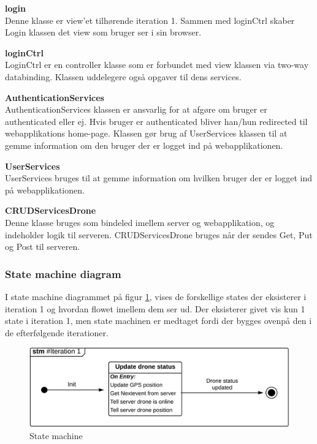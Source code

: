 \vspace{-0.2cm}

\textbf{login} \\
Denne klasse er view'et tilhørende iteration 1. Sammen med loginCtrl skaber Login klassen det view som bruger ser i sin browser.

\textbf{loginCtrl} \\
LoginCtrl er en controller klasse som er forbundet med view klassen via two-way databinding. Klassen uddelegere også opgaver til dens services.

\textbf{AuthenticationServices} \\
AuthenticationServices klassen er ansvarlig for at afgøre om bruger er authenticated eller ej. Hvis bruger er authenticated bliver han/hun redirected til webapplikations home-page. Klassen gør brug af UserServices klassen til at gemme information om den bruger der er logget ind på webapplikationen.

\textbf{UserServices}\\
UserServices bruges til at gemme information om hvilken bruger der er logget ind på webapplikationen.

\textbf{CRUDServicesDrone} \\
Denne klasse bruges som bindeled imellem server og webapplikation, og indeholder logik til serveren. CRUDServicesDrone bruges når der sendes Get, Put og Post til serveren.


\subsubsection*{State machine diagram}
\vspace{-0.1cm}
I state machine diagrammet på figur \ref{fig:Statemachine_iteration1}, vises de forskellige states der eksisterer i iteration 1 og hvordan flowet imellem dem ser ud. Der eksisterer givet vis kun 1 state i iteration 1, men state machinen er medtaget fordi der bygges ovenpå den i de efterfølgende iterationer.
\begin{figure}[H]
	\centering
	\includegraphics[width=1\textwidth]{Billeder/statemachine/State_iteration1.png}
	\vspace{-0.5cm}
	\caption{State machine}
	\label{fig:Statemachine_iteration1}
\end{figure}
